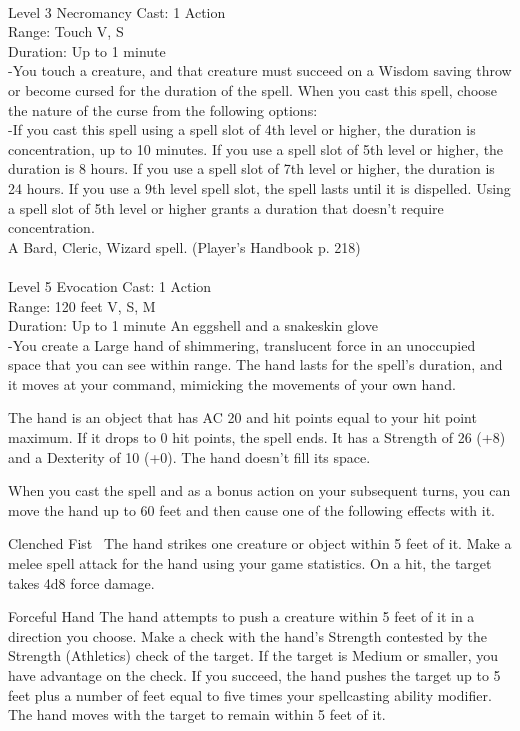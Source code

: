 \documentclass[10pt,twocolumn]{report}
\begin{document}
 \\
Level 3 \quad Necromancy \quad Cast: 1 Action\\
Range: Touch \quad V, S\\
Duration: Up to 1 minute \quad \\
-You touch a creature, and that creature must succeed on a Wisdom saving throw or become cursed for the duration of the spell. When you cast this spell, choose the nature of the curse from the following options:\\
-If you cast this spell using a spell slot of 4th level or higher, the duration is concentration, up to 10 minutes. 
If you use a spell slot of 5th level or higher, the duration is 8 hours. 
If you use a spell slot of 7th level or higher, the duration is 24 hours. 
If you use a 9th level spell slot, the spell lasts until it is dispelled. 
Using a spell slot of 5th level or higher grants a duration that doesn’t require concentration.\\
A Bard, Cleric, Wizard spell. (Player's Handbook p. 218) \\


 \\
Level 5 \quad Evocation \quad Cast: 1 Action\\
Range: 120 feet \quad V, S, M \\
Duration: Up to 1 minute \quad An eggshell and a snakeskin glove\\
-You create a Large hand of shimmering, translucent force in an unoccupied space that you can see within range. The hand lasts for the spell’s duration, and it moves at your command, mimicking the movements of your own hand. 

The hand is an object that has AC 20 and hit points equal to your hit point maximum. If it drops to 0 hit points, the spell ends. It has a Strength of 26 (+8) and a Dexterity of 10 (+0). The hand doesn’t fill its space. 

When you cast the spell and as a bonus action on your subsequent turns, you can move the hand up to 60 feet and then cause one of the following effects with it.

Clenched Fist 
The hand strikes one creature or object within 5 feet of it. Make a melee spell attack for the hand using your game statistics. On a hit, the target takes 4d8 force damage. 

Forceful Hand
The hand attempts to push a creature within 5 feet of it in a direction you choose. Make a check with the hand’s Strength contested by the Strength (Athletics) check of the target. If the target is Medium or smaller, you have advantage on the check. If you succeed, the hand pushes the target up to 5 feet plus a number of feet equal to five times your spellcasting ability modifier. The hand moves with the target to remain within 5 feet of it. 
\end{document}
